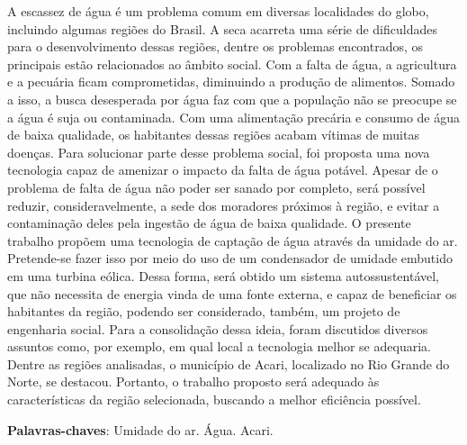 \begin{resumo}
 
 A escassez de água é um problema comum em diversas localidades do globo, incluindo algumas regiões do Brasil. 
 A seca acarreta uma série de dificuldades para o desenvolvimento dessas regiões, dentre os problemas encontrados,
 os principais estão relacionados ao âmbito social. Com a falta  de água, a agricultura e a pecuária ficam comprometidas,
 diminuindo a produção de alimentos. Somado a isso, a busca desesperada por água faz com que a população não se preocupe
 se a água é suja ou contaminada. Com uma alimentação precária e consumo de água de baixa qualidade, os habitantes dessas
 regiões acabam vítimas de muitas doenças. Para solucionar parte desse problema social, foi proposta uma nova tecnologia
 capaz de amenizar o impacto da falta de água potável. Apesar de o problema de falta de água não poder ser sanado por completo,
 será possível reduzir, consideravelmente, a sede dos moradores próximos à região, e evitar a contaminação deles pela ingestão
 de água de baixa qualidade. O presente trabalho propõem uma tecnologia de captação de água através da umidade do ar.
 Pretende-se fazer isso por meio do uso de um condensador de umidade embutido em uma turbina eólica. Dessa forma, será
 obtido um sistema autossustentável, que não necessita de energia vinda de uma fonte externa, e capaz de beneficiar os 
 habitantes da região, podendo ser considerado, também, um projeto de engenharia social. Para a consolidação dessa ideia,
 foram discutidos diversos assuntos como, por exemplo, em qual local a tecnologia melhor se adequaria. Dentre as regiões 
 analisadas, o município de Acari, localizado no Rio Grande do Norte, se destacou. Portanto, o trabalho proposto será adequado
 às características da região selecionada, buscando a melhor eficiência possível.

 \vspace{\onelineskip}
    
 \noindent
 \textbf{Palavras-chaves}: Umidade do ar. Água. Acari.
\end{resumo}

